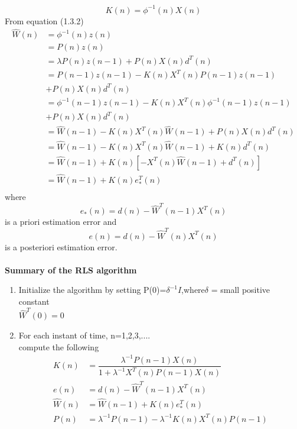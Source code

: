 \documentclass[journal,12pt,twocolumn]{IEEEtran}
\begin{document}
\begin{equation}
K(n)=\phi ^{-1} (n)X(n)
\end{equation}
From equation (1.3.2)
\begin{align*}
\hat W(n) &=\phi ^{-1}(n)z(n)\\
&=P(n)z(n)\\
&=\lambda P(n)z(n-1) + P(n) X(n) d^{T}(n)\\
&=P(n-1)z(n-1)-K(n)X^{T}(n)P(n-1)z(n-1) \\ &+P(n) X(n) d^{T}(n)\\
&=\phi ^{-1}(n-1)z(n-1)-K(n)X^{T}(n)\phi ^{-1}(n-1)z(n-1) 
\\ & +P(n) X(n) d^{T}(n)\\
&=\hat W(n-1)-K(n)X^{T}(n)\hat W(n-1) +P(n) X(n) d^{T}(n)\\
&=\hat W(n-1)-K(n)X^{T}(n)\hat W(n-1) +K(n)d^{T}(n)\\
&=\hat W(n-1)+K(n)[-X^{T}(n)\hat W(n-1) +d^{T}(n)]\\
&=\hat W(n-1)+K(n)e_{*}^{T}(n)\\
\end{align*}
where\\
\begin{equation}
e_{*}(n) = d(n)-\hat W^{T}(n-1)X^{T}(n) 
\end{equation}
is a priori estimation error and\\
\begin{equation}
e(n) = d(n)-\hat W^{T}(n)X^{T}(n) 
\end{equation}
is a posteriori estimation error.\\ \\
\medskip
\textbf{Summary of the RLS algorithm}
\begin{enumerate}
\item Initialize the algorithm by setting P(0)=$\delta ^{-1} I$,where$\delta$ = small positive constant\\
$\hat W^{T}(0)=0$ 
\item For each instant of time, n=1,2,3,....\\
 compute the following
 \begin{align*}
 K(n) &= \dfrac{\lambda ^{-1}P(n-1)X(n)}{1+ \lambda ^{-1}X^{T}(n)P(n-1)X(n)}\\
e(n) &= d(n)-\hat W^{T}(n-1)X^{T}(n)\\
\hat W(n)&=\hat W(n-1)+K(n)e_{*}^{T}(n)\\
P(n)&=\lambda ^{-1}P(n-1) - \lambda ^{-1} K(n)X^{T}(n)P(n-1)\\
\end{align*}
\end{enumerate}
\end{document}
